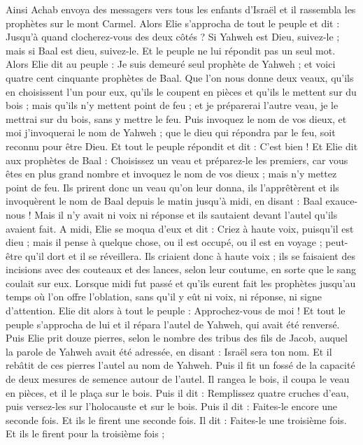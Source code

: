 \begin{multicols}{2}
Ainsi Achab envoya des messagers vers tous les enfants d'Israël et il rassembla les prophètes sur le mont Carmel.
Alors Elie s'approcha de tout le peuple et dit : Jusqu'à quand clocherez-vous des deux côtés ? Si Yahweh est Dieu, suivez-le ; mais si Baal est dieu, suivez-le. Et le peuple ne lui répondit pas un seul mot.
Alors Elie dit au peuple : Je suis demeuré seul prophète de Yahweh ; et voici quatre cent cinquante prophètes de Baal.
Que l'on nous donne deux veaux, qu'ils en choisissent l'un pour eux, qu'ils le coupent en pièces et qu'ils le mettent sur du bois ; mais qu'ils n'y mettent point de feu ; et je préparerai l'autre veau, je le mettrai sur du bois, sans y mettre le feu.
Puis invoquez le nom de vos dieux, et moi j'invoquerai le nom de Yahweh ; que le dieu qui répondra par le feu, soit reconnu pour être Dieu. Et tout le peuple répondit et dit : C'est bien !
Et Elie dit aux prophètes de Baal : Choisissez un veau et préparez-le les premiers, car vous êtes en plus grand nombre et invoquez le nom de vos dieux ; mais n'y mettez point de feu.
Ils prirent donc un veau qu'on leur donna, ils l'apprêtèrent et ils invoquèrent le nom de Baal depuis le matin jusqu'à midi, en disant : Baal exauce-nous ! Mais il n'y avait ni voix ni réponse et ils sautaient devant l'autel qu'ils avaient fait.
A midi, Elie se moqua d'eux et dit : Criez à haute voix, puisqu'il est dieu ; mais il pense à quelque chose, ou il est occupé, ou il est en voyage ; peut-être qu'il dort et il se réveillera.
Ils criaient donc à haute voix ; ils se faisaient des incisions avec des couteaux et des lances, selon leur coutume, en sorte que le sang coulait sur eux.
Lorsque midi fut passé et qu'ils eurent fait les prophètes jusqu'au temps où l'on offre l'oblation, sans qu'il y eût ni voix, ni réponse, ni signe d'attention.
Elie dit alors à tout le peuple : Approchez-vous de moi ! Et tout le peuple s'approcha de lui et il répara l'autel de Yahweh, qui avait été renversé.
Puis Elie prit douze pierres, selon le nombre des tribus des fils de Jacob, auquel la parole de Yahweh avait été adressée, en disant : Israël sera ton nom.
Et il rebâtit de ces pierres l'autel au nom de Yahweh. Puis il fit un fossé de la capacité de deux mesures de semence autour de l'autel.
Il rangea le bois, il coupa le veau en pièces, et il le plaça sur le bois.
Puis il dit : Remplissez quatre cruches d'eau, puis versez-les sur l'holocauste et sur le bois. Puis il dit : Faites-le encore une seconde fois. Et ils le firent une seconde fois. Il dit : Faites-le une troisième fois. Et ils le firent pour la troisième fois ;

\end{multicols}
